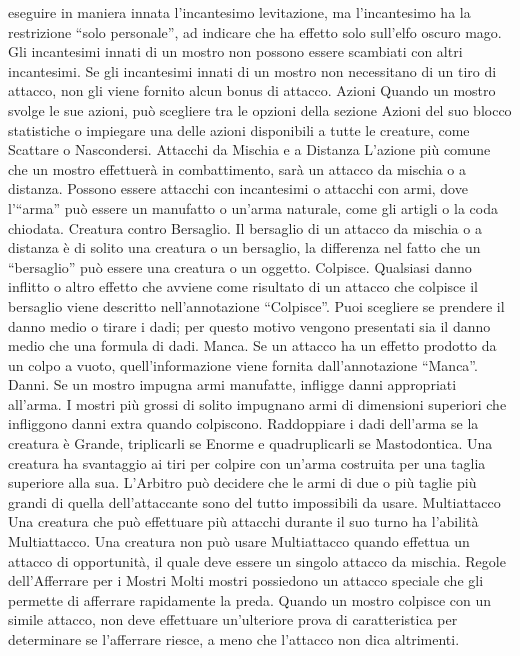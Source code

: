 \begin{multicols}{2}
eseguire in maniera innata l’incantesimo levitazione, ma
l’incantesimo ha la restrizione “solo personale”, ad indicare
che ha effetto solo sull’elfo oscuro mago.
Gli incantesimi innati di un mostro non possono essere
scambiati con altri incantesimi. Se gli incantesimi innati di
un mostro non necessitano di un tiro di attacco, non gli
viene fornito alcun bonus di attacco.
Azioni
Quando un mostro svolge le sue azioni, può scegliere tra
le opzioni della sezione Azioni del suo blocco statistiche o
impiegare una delle azioni disponibili a tutte le creature,
come Scattare o Nascondersi.
Attacchi da Mischia e a Distanza
L’azione più comune che un mostro effettuerà in
combattimento, sarà un attacco da mischia o a
distanza. Possono essere attacchi con incantesimi o
attacchi con armi, dove l’“arma” può essere un
manufatto o un’arma naturale, come gli artigli o la coda
chiodata.
Creatura contro Bersaglio. Il bersaglio di un attacco
da mischia o a distanza è di solito una creatura o un
bersaglio, la differenza nel fatto che un “bersaglio” può
essere una creatura o un oggetto.
Colpisce. Qualsiasi danno inflitto o altro effetto che
avviene come risultato di un attacco che colpisce il
bersaglio viene descritto nell’annotazione “Colpisce”.
Puoi scegliere se prendere il danno medio o tirare i
dadi; per questo motivo vengono presentati sia il danno
medio che una formula di dadi.
Manca. Se un attacco ha un effetto prodotto da un
colpo a vuoto, quell’informazione viene fornita
dall’annotazione “Manca”.
Danni. Se un mostro impugna armi manufatte, infligge
danni appropriati all’arma. I mostri più grossi di solito
impugnano armi di dimensioni superiori che infliggono
danni extra quando colpiscono. Raddoppiare i dadi
dell’arma se la creatura è Grande, triplicarli se Enorme
e quadruplicarli se Mastodontica.
Una creatura ha svantaggio ai tiri per colpire con un’arma
costruita per una taglia superiore alla sua. L’Arbitro può
decidere che le armi di due o più taglie più grandi di quella
dell’attaccante sono del tutto impossibili da usare.
Multiattacco
Una creatura che può effettuare più attacchi durante il
suo turno ha l’abilità Multiattacco. Una creatura non può
usare Multiattacco quando effettua un attacco di
opportunità, il quale deve essere un singolo attacco da
mischia.
Regole dell’Afferrare per i Mostri
Molti mostri possiedono un attacco speciale che gli permette di
afferrare rapidamente la preda. Quando un mostro colpisce con
un simile attacco, non deve effettuare un’ulteriore prova di
caratteristica per determinare se l’afferrare riesce, a meno che
l’attacco non dica altrimenti.

\end{multicols}
